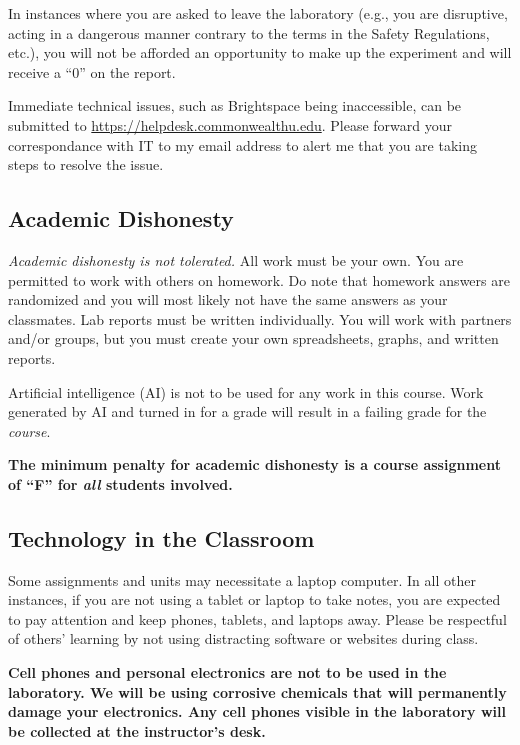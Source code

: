 \documentclass[11pt,letterpaper]{article}
\begin{document}
In instances where you are asked to leave the laboratory (e.g., you are
disruptive, acting in a dangerous manner contrary to the terms in the Safety
Regulations, etc.), you will not be afforded an opportunity to make up the
experiment and will receive a ``0'' on the report.

Immediate technical issues, such as Brightspace being inaccessible, can be submitted to
\url{https://helpdesk.commonwealthu.edu}. Please forward your correspondance
with IT to my email address to alert me that you are taking steps to resolve the issue.

\subsection{Academic Dishonesty}
\emph{Academic dishonesty is not tolerated.} 
All work must be your own. You are permitted to work with others on homework. Do
note that homework answers are randomized and you will most likely not have the
same answers as your classmates. Lab reports must be written individually. You
will work with partners and/or groups, but you must create your own
spreadsheets, graphs, and written reports.

Artificial intelligence (AI) is not to be used for any work in this course. Work
generated by AI and turned in for a grade will result in a failing grade for the
\emph{course}.

\begin{mdframed}
	\centering\bfseries The minimum penalty for academic dishonesty is a
	course assignment of ``F'' for \emph{all} students involved.
\end{mdframed}

\subsection{Technology in the Classroom}
Some assignments and units may necessitate a laptop computer. In all other
instances, if you are not using a tablet or laptop to take notes, you are
expected to pay attention and keep phones, tablets, and laptops away. Please be
respectful of others' learning by not using distracting software or websites
during class.

\begin{mdframed}
	\centering\bfseries Cell phones and personal electronics are not to be
	used in the laboratory. We will be using corrosive chemicals that will
	permanently damage your electronics. Any cell phones visible in the
	laboratory will be collected at the instructor's desk.
\end{mdframed}
\end{document}

